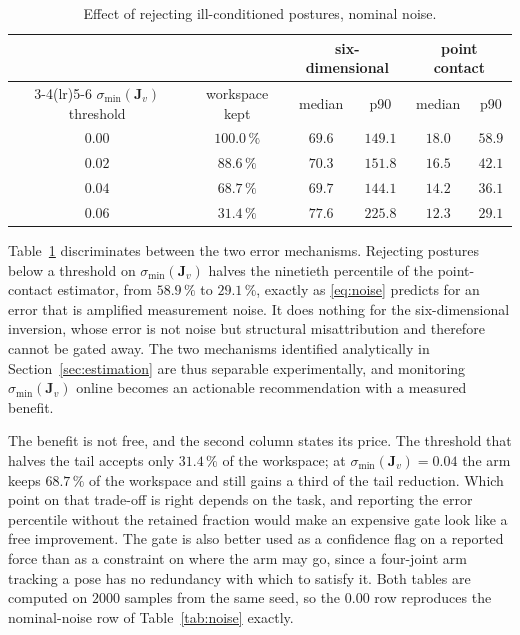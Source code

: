 \documentclass{ieeeaccess}
\newcommand{\Jv}{\bm{J}_{\!v}}
\begin{document}
\begin{table}[!t]
\caption{Effect of rejecting ill-conditioned postures, nominal noise.}
\label{tab:gating}
\centering
\footnotesize
\setlength{\tabcolsep}{3pt}
\begin{tabular}{cccccc}
\toprule
& & \multicolumn{2}{c}{six-dimensional} & \multicolumn{2}{c}{point contact}\\
\cmidrule(lr){3-4}\cmidrule(lr){5-6}
$\sigma_{\min}(\Jv)$ threshold & workspace kept & median & p90 & median & p90\\
\midrule
$0.00$ & $100.0\,\%$ & $69.6$ & $149.1$ & $18.0$ & $58.9$\\
$0.02$ & $88.6\,\%$  & $70.3$ & $151.8$ & $16.5$ & $42.1$\\
$0.04$ & $68.7\,\%$  & $69.7$ & $144.1$ & $14.2$ & $36.1$\\
$0.06$ & $31.4\,\%$  & $77.6$ & $225.8$ & $\bm{12.3}$ & $\bm{29.1}$\\
\bottomrule
\end{tabular}
\end{table}

Table~\ref{tab:gating} discriminates between the two error mechanisms. Rejecting
postures below a threshold on $\sigma_{\min}(\Jv)$ halves the ninetieth percentile
of the point-contact estimator, from $58.9\,\%$ to $29.1\,\%$, exactly as
\eqref{eq:noise} predicts for an error that is amplified measurement noise. It
does nothing for the six-dimensional inversion, whose error is not noise but
structural misattribution and therefore cannot be gated away. The two mechanisms
identified analytically in Section~\ref{sec:estimation} are thus separable
experimentally, and monitoring $\sigma_{\min}(\Jv)$ online becomes an actionable
recommendation with a measured benefit.

The benefit is not free, and the second column states its price. The threshold
that halves the tail accepts only $31.4\,\%$ of the workspace; at
$\sigma_{\min}(\Jv)=0.04$ the arm keeps $68.7\,\%$ of the workspace and still
gains a third of the tail reduction. Which point on that trade-off is right
depends on the task, and reporting the error percentile without the retained
fraction would make an expensive gate look like a free improvement. The gate is
also better used as a confidence flag on a reported force than as a constraint on
where the arm may go, since a four-joint arm tracking a pose has no redundancy
with which to satisfy it. Both tables are computed on $2000$ samples from the same
seed, so the $0.00$ row reproduces the nominal-noise row of
Table~\ref{tab:noise} exactly.
\end{document}
